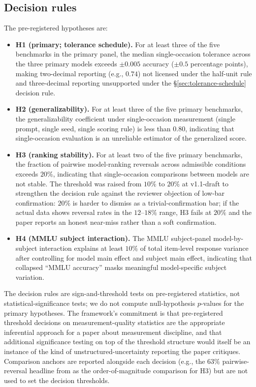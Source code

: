 \documentclass[11pt]{article}
\begin{document}
\subsection{Decision rules}
\label{sec:design-decisions}

The pre-registered hypotheses are:

\begin{itemize}
  \item \textbf{H1 (primary; tolerance schedule).} For at least
    three of the five benchmarks in the primary panel, the median
    single-occasion tolerance across the three primary models
    exceeds $\pm 0.005$ accuracy ($\pm 0.5$ percentage points),
    making two-decimal reporting (e.g., $0.74$) not licensed under
    the half-unit rule and three-decimal
    reporting unsupported under the §\ref{sec:tolerance-schedule}
    decision rule.

  \item \textbf{H2 (generalizability).} For at least three of the
    five primary benchmarks, the generalizability coefficient under
    single-occasion measurement (single prompt, single seed, single
    scoring rule) is less than $0.80$, indicating that
    single-occasion evaluation is an unreliable estimator of the
    generalized score.

  \item \textbf{H3 (ranking stability).} For at least two of the
    five primary benchmarks, the fraction of pairwise model-ranking
    reversals across admissible conditions exceeds $20\%$,
    indicating that single-occasion comparisons between models are
    not stable. The threshold was raised from $10\%$ to $20\%$ at
    v1.1-draft to strengthen the decision rule against the reviewer
    objection of low-bar confirmation: $20\%$ is harder to dismiss
    as a trivial-confirmation bar; if the actual data shows reversal
    rates in the $12$--$18\%$ range, H3 fails at $20\%$ and the
    paper reports an honest near-miss rather than a soft confirmation.

  \item \textbf{H4 (MMLU subject interaction).} The MMLU subject-panel
    model-by-subject interaction explains at least $10\%$ of total
    item-level response variance after controlling for model main
    effect and subject main effect, indicating that collapsed
    ``MMLU accuracy'' masks meaningful model-specific subject
    variation.
\end{itemize}

The decision rules are sign-and-threshold tests on
pre-registered statistics, not statistical-significance tests; we
do not compute null-hypothesis $p$-values for the primary
hypotheses. The framework's commitment is that pre-registered
threshold decisions on measurement-quality statistics are the
appropriate inferential approach for a paper about measurement
discipline, and that additional significance testing on top of the
threshold structure would itself be an instance of the kind of
unstructured-uncertainty reporting the paper critiques. Comparison
anchors are reported alongside each decision (e.g., the $63\%$
pairwise-reversal headline from \citet{romanou2026brittlebench} as
the order-of-magnitude comparison for H3) but are not used to set
the decision thresholds.
\end{document}
